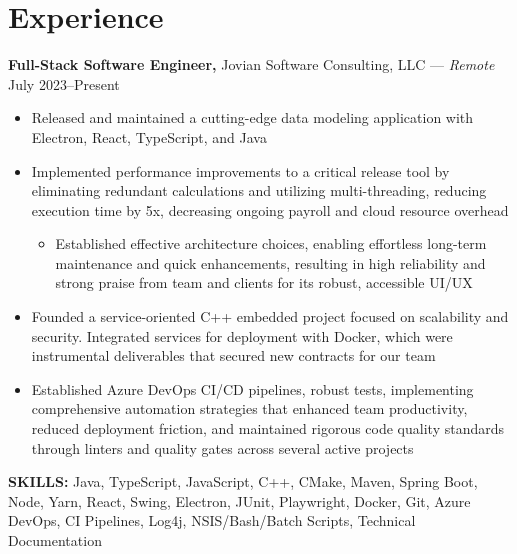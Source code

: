 \documentclass[11pt]{article}       %
\begin{document}
\section*{Experience}
\textbf{Full-Stack Software Engineer,} {Jovian Software Consulting, LLC} --- \textit{Remote} \hfill July 2023--Present \\
\vspace{-9pt}
\begin{itemize}[leftmargin=0.35in]
  \item Released and maintained a cutting-edge data modeling application with Electron, React, TypeScript, and Java
  \item Implemented performance improvements to a critical release tool by eliminating redundant calculations and utilizing multi-threading, reducing execution time by 5x, decreasing ongoing payroll and cloud resource overhead
  \vspace{-9pt}
  \begin{itemize}
    \item Established effective architecture choices, enabling effortless long-term maintenance and quick enhancements, resulting in high reliability and strong praise from team and clients for its robust, accessible UI/UX
  \end{itemize}
  \vspace{-9pt}
  \item Founded a service-oriented C++ embedded project focused on scalability and security. Integrated services for deployment with Docker, which were instrumental deliverables that secured new contracts for our team
  \item Established Azure DevOps CI/CD pipelines, robust tests, implementing comprehensive automation strategies that enhanced team productivity, reduced deployment friction, and maintained rigorous code quality standards through linters and quality gates across several active projects
\end{itemize}
\vspace{-9pt}
\textbf{SKILLS:} Java, TypeScript, JavaScript, C++, CMake, Maven, Spring Boot, Node, Yarn, React, Swing, Electron, JUnit, Playwright, Docker, Git, Azure DevOps, CI Pipelines, Log4j, NSIS/Bash/Batch Scripts, Technical Documentation
\vspace{9pt}
\end{document}
